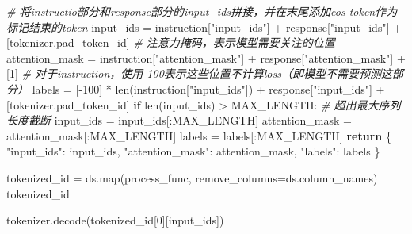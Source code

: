 \documentclass[
]{article}
\newenvironment{Shaded}{}{}
\newcommand{\BuiltInTok}[1]{\textcolor[rgb]{0.00,0.50,0.00}{#1}}
\newcommand{\CommentTok}[1]{\textcolor[rgb]{0.38,0.63,0.69}{\textit{#1}}}
\newcommand{\ControlFlowTok}[1]{\textcolor[rgb]{0.00,0.44,0.13}{\textbf{#1}}}
\newcommand{\DecValTok}[1]{\textcolor[rgb]{0.25,0.63,0.44}{#1}}
\newcommand{\NormalTok}[1]{#1}
\newcommand{\OperatorTok}[1]{\textcolor[rgb]{0.40,0.40,0.40}{#1}}
\newcommand{\StringTok}[1]{\textcolor[rgb]{0.25,0.44,0.63}{#1}}
\begin{document}
\begin{Shaded}
\begin{Highlighting}[]
    \CommentTok{\# 将instructio部分和response部分的input\_ids拼接，并在末尾添加eos token作为标记结束的token}
\NormalTok{    input\_ids }\OperatorTok{=}\NormalTok{ instruction[}\StringTok{"input\_ids"}\NormalTok{] }\OperatorTok{+}\NormalTok{ response[}\StringTok{"input\_ids"}\NormalTok{] }\OperatorTok{+}\NormalTok{ [tokenizer.pad\_token\_id]}
    \CommentTok{\# 注意力掩码，表示模型需要关注的位置}
\NormalTok{    attention\_mask }\OperatorTok{=}\NormalTok{ instruction[}\StringTok{"attention\_mask"}\NormalTok{] }\OperatorTok{+}\NormalTok{ response[}\StringTok{"attention\_mask"}\NormalTok{] }\OperatorTok{+}\NormalTok{ [}\DecValTok{1}\NormalTok{]}
    \CommentTok{\# 对于instruction，使用{-}100表示这些位置不计算loss（即模型不需要预测这部分）}
\NormalTok{    labels }\OperatorTok{=}\NormalTok{ [}\OperatorTok{{-}}\DecValTok{100}\NormalTok{] }\OperatorTok{*} \BuiltInTok{len}\NormalTok{(instruction[}\StringTok{"input\_ids"}\NormalTok{]) }\OperatorTok{+}\NormalTok{ response[}\StringTok{"input\_ids"}\NormalTok{] }\OperatorTok{+}\NormalTok{ [tokenizer.pad\_token\_id]}
    \ControlFlowTok{if} \BuiltInTok{len}\NormalTok{(input\_ids) }\OperatorTok{\textgreater{}}\NormalTok{ MAX\_LENGTH:  }\CommentTok{\# 超出最大序列长度截断}
\NormalTok{        input\_ids }\OperatorTok{=}\NormalTok{ input\_ids[:MAX\_LENGTH]}
\NormalTok{        attention\_mask }\OperatorTok{=}\NormalTok{ attention\_mask[:MAX\_LENGTH]}
\NormalTok{        labels }\OperatorTok{=}\NormalTok{ labels[:MAX\_LENGTH]}
    \ControlFlowTok{return}\NormalTok{ \{}
        \StringTok{"input\_ids"}\NormalTok{: input\_ids,}
        \StringTok{"attention\_mask"}\NormalTok{: attention\_mask,}
        \StringTok{"labels"}\NormalTok{: labels}
\NormalTok{    \}}
\end{Highlighting}
\end{Shaded}

\begin{Shaded}
\begin{Highlighting}[]
\NormalTok{tokenized\_id }\OperatorTok{=}\NormalTok{ ds.}\BuiltInTok{map}\NormalTok{(process\_func, remove\_columns}\OperatorTok{=}\NormalTok{ds.column\_names)}
\NormalTok{tokenized\_id}
\end{Highlighting}
\end{Shaded}

\begin{Shaded}
\begin{Highlighting}[]
\NormalTok{tokenizer.decode(tokenized\_id[}\DecValTok{0}\NormalTok{][}\StringTok{\textquotesingle{}input\_ids\textquotesingle{}}\NormalTok{])}
\end{Highlighting}
\end{Shaded}
\end{document}
